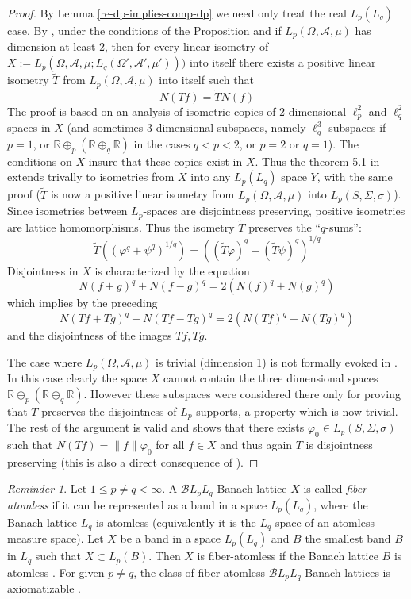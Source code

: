 \documentclass[11pt]{amsart}
\theoremstyle{plain}
\theoremstyle{remark}
\newtheorem{recall}[theorem]{Reminder}
\newcommand{\A}{\mathcal A}
\newcommand{\ph}{\varphi}
\newcommand{\reel}{\mathbb R}
\begin{document}
\begin{proof} By Lemma \ref{re-dp-implies-comp-dp} we need only treat the real $L_p(L_q)$ case.
By  \cite[Theorem 5.1  and Proposition 1.6]{GR}, under the conditions of the Proposition and if $L_p(\Omega,\A,\mu)$ has dimension at least 2, then for every linear isometry of  $X:=L_p(\Omega,\A,\mu;L_q(\Omega',\A',\mu')))$ into itself there exists a positive linear isometry $\widetilde T$ from  $L_p(\Omega,\A,\mu)$ into itself such that 
$$N(Tf)=\widetilde T N(f)$$
 The proof is based on an analysis of isometric copies of 2-dimensional $\ell_p^2$ and $\ell_q^2$ spaces in $X$ (and sometimes 3-dimensional subspaces, namely $\ell_q^3$-subspaces if $p=1$, or $\reel\oplus_p(\reel\oplus_q\reel)$ in the cases $q<p<2$, or $p=2$ or $q=1$). The conditions on $X$ insure that these copies exist in $X$. Thus the theorem 5.1  in \cite{GR} extends trivally to isometries from $X$ into any $L_p(L_q)$ space $Y$,  with the same proof ($\widetilde T$ is now a positive linear isometry from $L_p(\Omega,\A,\mu)$ into $L_p(S,\Sigma,\sigma)$).
Since isometries between $L_p$-spaces are disjointness preserving, positive isometries are lattice homomorphisms. Thus the isometry $\widetilde T$ preserves the ``$q$-sums'':
$$\widetilde T((\ph^q+\psi^q)^{1/q})=((\widetilde T\ph)^q+(\widetilde T\psi)^q)^{1/q}$$
Disjointness in $X$ is characterized by the equation
$$N(f+g)^q+N(f-g)^q=2(N(f)^q+N(g)^q)$$
which implies by the preceding
$$N(Tf+Tg)^q+N(Tf-Tg)^q=2(N(Tf)^q+N(Tg)^q)$$
and the disjointness of the images $Tf,Tg$.

The case where $L_p(\Omega,\A,\mu)$ is trivial (dimension 1) is not formally evoked in \cite{GR}. In this case clearly the space $X$ cannot contain the three dimensional spaces $\reel\oplus_p(\reel\oplus_q\reel)$. However these subspaces were considered there only for proving that $T$ preserves the disjointness of $L_p$-supports, a property which is now trivial. The rest of the argument is valid and shows that there exists $\ph_0\in L_p(S,\Sigma,\sigma)$ such that $N(Tf)=\|f\| \ph_0$ for all $f\in X$ and thus again $T$ is disjointness preserving (this is also a direct consequence of \cite[prop. 5.4 and 5.8]{GR}).
\end{proof}

\begin{recall}
Let $1\le p\ne q<\infty$. A $\mathcal BL_pL_q$ Banach lattice $X$ is called {\it fiber-atomless} if it can be represented as a band in a space $L_p(L_q)$, where the Banach lattice $L_q$ is atomless (equivalently it is the $L_q$-space of an atomless measure space). 
Let $X$ be a band in a space $L_p( L_q)$ and $B$ the smallest band $B$ in $L_q$ such that $X\subset L_p(B)$.
Then $X$ is  fiber-atomless if the Banach lattice $B$ is atomless \cite[Lemma 2.3]{HR-11}. For given $p\ne q$, the class of fiber-atomless $\mathcal BL_pL_q$ Banach lattices is axiomatizable \cite[Proposition 2.5]{HR-11}.\end{recall} 
\end{document}

